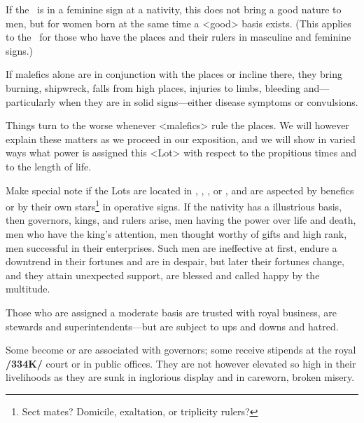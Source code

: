 If the \Moon\, is in a feminine sign at a nativity, this does not bring a good nature to men, but for women born at the same time a <good> basis exists. (This applies to the \Sun\, for those who have the
places and their rulers in masculine and feminine signs.) 

If malefics alone are in conjunction with the  places or incline there, they bring burning, shipwreck, falls from high places, injuries to limbs, bleeding and—particularly when they are in solid signs—either disease symptoms or convulsions. 

Things turn to the worse whenever <malefics> rule the places. We will however explain these matters as we proceed in our exposition, and we will show in varied ways what power is assigned this <Lot> with respect to the propitious times and to the length of life.

Make  special note if the Lots are located in \Cancer, \Leo, \Capricorn, or \Aquarius, and are aspected by benefics or by their own stars\footnote{Sect mates? Domicile, exaltation, or triplicity rulers?} in operative signs. If the nativity has a illustrious basis, then governors,
kings, and rulers arise, men having the power over life and death, men who have the king’s attention, men thought worthy of gifts and high rank, men successful in their enterprises. Such men are ineffective at first, endure a downtrend in their fortunes and are in despair, but later their fortunes change, and they attain unexpected support, are blessed and called happy by the multitude. 

Those who are assigned a moderate basis are trusted with royal business, are stewards and superintendents—but are subject to ups and downs and hatred. 

Some become or are associated with governors; some receive stipends at the royal \textbf{/334K/} court or in public offices. They are not however elevated so high in their livelihoods as they are sunk in
inglorious display and in careworn, broken misery.

\newpage